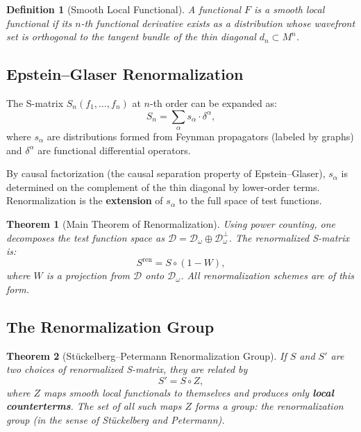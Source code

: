 \documentclass[11pt,a4paper]{article}
\newtheorem{definition}{Definition}[section]
\newtheorem{theorem}{Theorem}[section]
\begin{document}
\begin{definition}[Smooth Local Functional]
A functional $F$ is a smooth local functional if its $n$-th functional
derivative exists as a distribution whose wavefront set is orthogonal
to the tangent bundle of the thin diagonal $d_n \subset M^n$.
\end{definition}

\subsection{Epstein--Glaser Renormalization}

The S-matrix $S_n(f_1,\ldots,f_n)$ at $n$-th order can be expanded as:
\begin{equation}
  S_n = \sum_\alpha s_\alpha \cdot \delta^\alpha,
\end{equation}
where $s_\alpha$ are distributions formed from Feynman propagators
(labeled by graphs) and $\delta^\alpha$ are functional differential
operators.

By causal factorization (the causal separation property of Epstein--Glaser),
$s_\alpha$ is determined on the complement of the thin diagonal by lower-order
terms. Renormalization is the \textbf{extension} of $s_\alpha$ to the full
space of test functions.

\begin{theorem}[Main Theorem of Renormalization]
Using power counting, one decomposes the test function space as
$\mathcal{D} = \mathcal{D}_\omega \oplus \mathcal{D}_\omega^\perp$.
The renormalized S-matrix is:
\[
  S^\mathrm{ren} = S \circ (1 - W),
\]
where $W$ is a projection from $\mathcal{D}$ onto $\mathcal{D}_\omega$.
All renormalization schemes are of this form.
\end{theorem}

\subsection{The Renormalization Group}

\begin{theorem}[St\"uckelberg--Petermann Renormalization Group]
If $S$ and $S'$ are two choices of renormalized S-matrix, they are related by
\[
  S' = S \circ Z,
\]
where $Z$ maps smooth local functionals to themselves and produces only
\textbf{local counterterms}. The set of all such maps $Z$ forms a group:
the renormalization group (in the sense of St\"uckelberg and Petermann).
\end{theorem}
\end{document}
